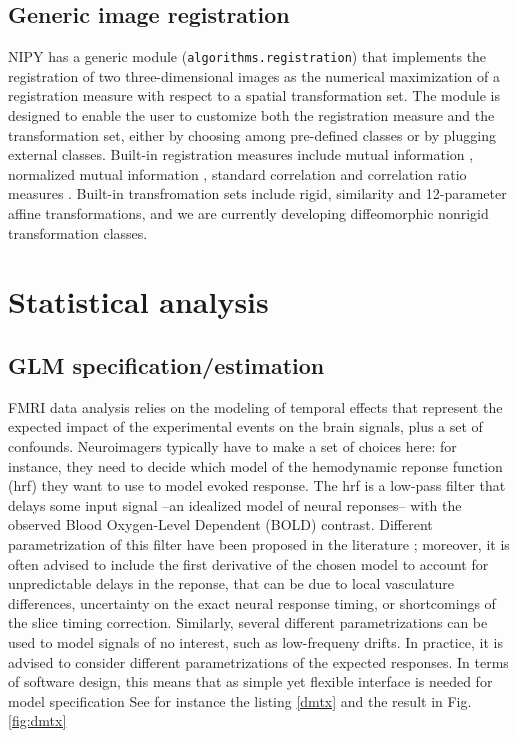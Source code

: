 \documentclass{bioinfo}
\begin{document}
\subsection{Generic image registration}

NIPY has a generic module ({\tt algorithms.registration}) that
implements the registration of two three-dimensional images as the
numerical maximization of a registration measure with respect to a
spatial transformation set. The module is designed to enable the user
to customize both the registration measure and the transformation set,
either by choosing among pre-defined classes or by plugging external
classes. Built-in registration measures include mutual information
\citep{maes:tmi:97}, normalized mutual information
\citep{studholme:pr:98}, standard correlation and correlation ratio
measures \citep{roche:ijist:00}. Built-in transfromation sets include
rigid, similarity and 12-parameter affine transformations, and we are
currently developing diffeomorphic nonrigid transformation classes.





\section{Statistical analysis}

\subsection{GLM specification/estimation}

FMRI data analysis relies on the modeling of temporal effects that
represent the expected impact of the experimental events on the brain
signals, plus a set of confounds.
%
Neuroimagers typically have to make a set of choices here: for
instance, they need to decide which model of the hemodynamic reponse
function (hrf) they want to use to model evoked response. 
%
The hrf is a low-pass filter that delays some input signal --an
idealized model of neural reponses-- with the observed Blood
Oxygen-Level Dependent (BOLD) contrast.
%
Different parametrization of this filter have been proposed in the
literature \cite{Friston1998,Glover1999}; moreover, it is often
advised to include the first derivative of the chosen model to account
for unpredictable delays in the reponse, that can be due to local
vasculature differences, uncertainty on the exact neural response
timing, or shortcomings of the slice timing correction.
%
Similarly, several different parametrizations can be used to model
signals of no interest, such as low-frequeny drifts.
%
In practice, it is advised to consider different parametrizations of
the expected responses.
% 
In terms of software design, this means that as simple yet flexible
interface is needed for model specification
See for instance the listing \ref{dmtx} and the result in Fig. \ref{fig:dmtx}
\end{document}

